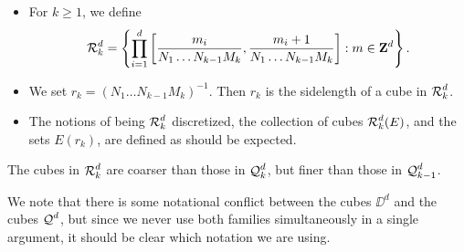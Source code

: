 %
\begin{itemize}
	\item For $k \geq 1$, we define
	\[ \operatorname{\mathcal{R}}_k^d = \left\{ \prod_{i = 1}^d \left[ \frac{m_i}{N_1 \dots N_{k-1} M_k} , \frac{m_i + 1}{N_1 \dots N_{k-1} M_k} \right] : m \in \mathbf{Z}^d \right\}. \]

	\item We set $r_k = (N_1 \dots N_{k-1} M_k)^{-1}$. Then $r_k$ is the sidelength of a cube in $\operatorname{\mathcal{R}}_k^d$.

	\item The notions of being $\operatorname{\mathcal{R}}_k^d$ discretized, the collection of cubes $\operatorname{\mathcal{R}}_k^d(E)$, and the sets $E(r_k)$, are defined as should be expected.
\end{itemize}
%
The cubes in $\operatorname{\mathcal{R}}_k^d$ are coarser than those in $\operatorname{\mathcal{Q}}_k^d$, but finer than those in $\operatorname{\mathcal{Q}}_{k-1}^d$.

\begin{remark}
	We note that there is some notational conflict between the cubes $\DD^d$ and the cubes $\operatorname{\mathcal{Q}}^d$, but since we never use both families simultaneously in a single argument, it should be clear which notation we are using.
\end{remark}

%
%
%
%


